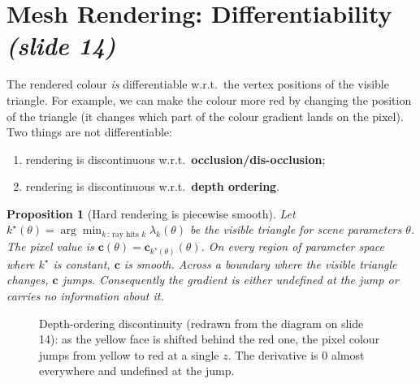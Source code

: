 \documentclass[11pt,a4paper]{article}
\newcommand{\sr}[1]{\texorpdfstring{\emph{(#1)}}{(#1)}}
\theoremstyle{definition}
\theoremstyle{plain}
\newtheorem{proposition}[definition]{Proposition}
\theoremstyle{remark}
\begin{document}
\section{Mesh Rendering: Differentiability \sr{slide 14}}
The rendered colour \emph{is} differentiable w.r.t.\ the vertex positions of the visible triangle. For example, we can make the colour more red by changing the position of the triangle (it changes which part of the colour gradient lands on the pixel). Two things are not differentiable:
\begin{enumerate}[nosep]
\item rendering is discontinuous w.r.t.\ \textbf{occlusion/dis-occlusion};
\item rendering is discontinuous w.r.t.\ \textbf{depth ordering}.
\end{enumerate}

\begin{proposition}[Hard rendering is piecewise smooth]
Let $k^\star(\theta)=\arg\min_{k\,:\,\text{ray hits }k}\lambda_k(\theta)$ be the visible triangle for scene parameters $\theta$. The pixel value is $\bm c(\theta)=\bm c_{k^\star(\theta)}(\theta)$. On every region of parameter space where $k^\star$ is constant, $\bm c$ is smooth. Across a boundary where the visible triangle changes, $\bm c$ jumps. Consequently the gradient is either undefined at the jump or carries no information about it.
\end{proposition}

\begin{figure}[htbp]
\centering
{}
\caption{Depth-ordering discontinuity (redrawn from the diagram on slide 14): as the yellow face is shifted behind the red one, the pixel colour jumps from yellow to red at a single $z$. The derivative is $0$ almost everywhere and undefined at the jump.}
\end{figure}
\end{document}

